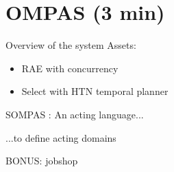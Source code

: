 \section{OMPAS (3 min)}
\begin{frame}{Overview of the system}
Assets:
    \begin{itemize}
        \item RAE with concurrency
        \item Select with HTN temporal planner
    \end{itemize}
\end{frame}
\begin{frame}{SOMPAS : An acting language...}
\end{frame}

\begin{frame}{...to define acting domains}
    
\end{frame}

\begin{frame}{BONUS: jobshop}
    
\end{frame}

